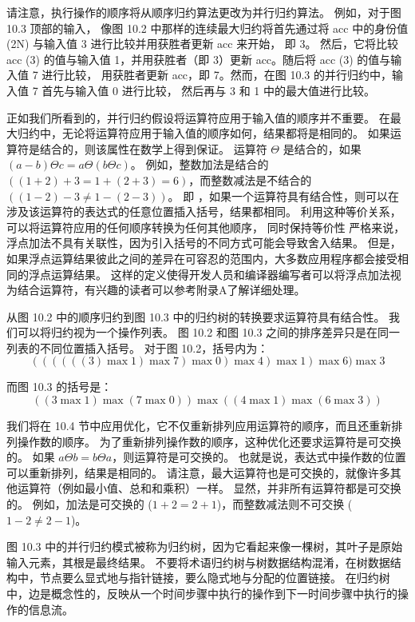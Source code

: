 请注意，执行操作的顺序将从顺序归约算法更改为并行归约算法。 
例如，对于图 10.3 顶部的输入，
像图 10.2 中那样的连续最大归约将首先通过将 acc 中的身份值 (2N) 与输入值 3 进行比较并用获胜者更新 acc 来开始， 即 3。
然后，它将比较 acc (3) 的值与输入值 1，并用获胜者（即 3）更新 acc。随后将 acc (3) 的值与输入值 7 进行比较， 
用获胜者更新 acc，即 7。然而，在图 10.3 的并行归约中，输入值 7 首先与输入值 0 进行比较，
然后再与 3 和 1 中的最大值进行比较。

正如我们所看到的，并行归约假设将运算符应用于输入值的顺序并不重要。 
在最大归约中，无论将运算符应用于输入值的顺序如何，结果都将是相同的。 如果运算符是结合的，则该属性在数学上得到保证。 
运算符 $\Theta$ 是结合的，如果 $(a-b) \Theta c=a \Theta(b \Theta c)$。 
例如，整数加法是结合的 $((1+2)+3=1+(2+3)=6)$，而整数减法是不结合的 $((1-2)-3 \neq 1-(2-3))$。
即 ，如果一个运算符具有结合性，则可以在涉及该运算符的表达式的任意位置插入括号，结果都相同。
利用这种等价关系，可以将运算符应用的任何顺序转换为任何其他顺序，
同时保持等价性 严格来说，浮点加法不具有关联性，因为引入括号的不同方式可能会导致舍入结果。
但是，如果浮点运算结果彼此之间的差异在可容忍的范围内，大多数应用程序都会接受相同的浮点运算结果。 
这样的定义使得开发人员和编译器编写者可以将浮点加法视为结合运算符，有兴趣的读者可以参考附录A了解详细处理。

从图 10.2 中的顺序归约到图 10.3 中的归约树的转换要求运算符具有结合性。 我们可以将归约视为一个操作列表。 
图 10.2 和图 10.3 之间的排序差异只是在同一列表的不同位置插入括号。 对于图 10.2，括号内为：
$$
((((((3)\max 1) \max 7) \max 0) \max 4) \max 1) \max 6) \max 3
$$

而图 10.3 的括号是：
$$
((3 \max 1) \max (7 \max 0)) \max ((4 \max 1) \max (6 \max 3))
$$

我们将在 10.4 节中应用优化，它不仅重新排列应用运算符的顺序，而且还重新排列操作数的顺序。 
为了重新排列操作数的顺序，这种优化还要求运算符是可交换的。 如果 $a \Theta b=b \Theta a$，则运算符是可交换的。 
也就是说，表达式中操作数的位置可以重新排列，结果是相同的。 
请注意，最大运算符也是可交换的，就像许多其他运算符（例如最小值、总和和乘积）一样。 
显然，并非所有运算符都是可交换的。 例如，加法是可交换的 ($1+2 = 2+1$)，而整数减法则不可交换 ($1 - 2 \neq 2 - 1$)。

图 10.3 中的并行归约模式被称为归约树，因为它看起来像一棵树，其叶子是原始输入元素，其根是最终结果。 
不要将术语归约树与树数据结构混淆，在树数据结构中，节点要么显式地与指针链接，要么隐式地与分配的位置链接。 
在归约树中，边是概念性的，反映从一个时间步骤中执行的操作到下一时间步骤中执行的操作的信息流。


